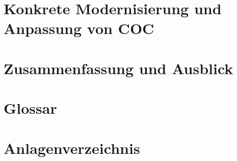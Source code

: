 \documentclass [12pt, a4paper, oneside, titlepage, ngerman]{article}
\begin{document}
\section {Konkrete Modernisierung und Anpassung von COC}
\newpage

\section {Zusammenfassung und Ausblick}
\newpage





\newpage

\setcounter{page}{4}
\section* {Glossar}
\newpage

\section* {Anlagenverzeichnis}
\newpage
\end{document}
